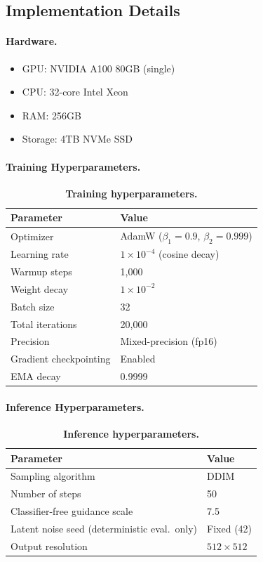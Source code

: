\documentclass[journal]{IEEEtran}
\begin{document}
\subsection{Implementation Details}

\paragraph{Hardware.}
\begin{itemize}
    \item GPU: NVIDIA A100 80GB (single)
    \item CPU: 32-core Intel Xeon
    \item RAM: 256GB
    \item Storage: 4TB NVMe SSD
\end{itemize}

\paragraph{Training Hyperparameters.}
\begin{table}[H]
\centering
\caption{\textbf{Training hyperparameters.}}
\label{tab:hyperparams}
\begin{tabular}{ll}
\toprule
Parameter & Value \\
\midrule
Optimizer & AdamW ($\beta_1=0.9$, $\beta_2=0.999$) \\
Learning rate & $1\times10^{-4}$ (cosine decay) \\
Warmup steps & 1,000 \\
Weight decay & $1\times10^{-2}$ \\
Batch size & 32 \\
Total iterations & 20,000 \\
Precision & Mixed-precision (fp16) \\
Gradient checkpointing & Enabled \\
EMA decay & 0.9999 \\
\bottomrule
\end{tabular}
\end{table}

\paragraph{Inference Hyperparameters.}
\begin{table}[H]
\centering
\caption{\textbf{Inference hyperparameters.}}
\label{tab:inference_hp}
\begin{tabular}{ll}
\toprule
Parameter & Value \\
\midrule
Sampling algorithm & DDIM \cite{song2022denoisingdiffusionimplicitmodels} \\
Number of steps & 50 \\
Classifier-free guidance scale & 7.5 \\
Latent noise seed (deterministic eval.\ only) & Fixed (42) \\
Output resolution & $512\times512$ \\
\bottomrule
\end{tabular}
\end{table}
\end{document}
